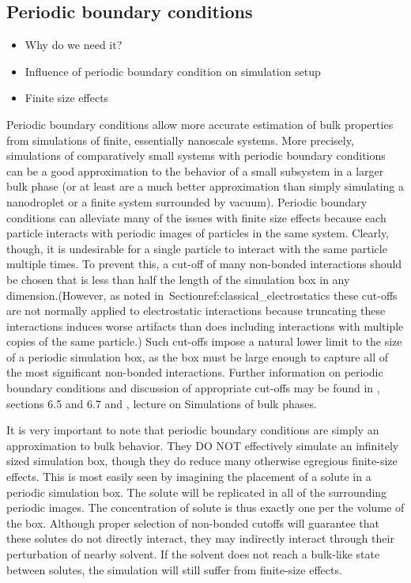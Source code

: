 \documentclass[9pt,bestpractices]{livecoms}
\begin{document}
\subsection{Periodic boundary conditions}
\label{sec:periodic}
\begin{itemize}
\item Why do we need it?
\item Influence of periodic boundary condition on simulation setup
\item Finite size effects
\end{itemize}


Periodic boundary conditions allow more accurate estimation of bulk properties from simulations of finite, essentially nanoscale systems.
More precisely, simulations of comparatively small systems with periodic boundary conditions can be a good approximation to the   behavior of a small subsystem in a larger bulk phase (or at least are a much better approximation than simply simulating a nanodroplet or a finite system surrounded by vacuum).
Periodic boundary conditions can alleviate many of the issues with finite size effects because each particle interacts with periodic images of particles in the same system.
Clearly, though, it is undesirable for a single particle to interact with the same particle multiple times.
To prevent this, a cut-off of many non-bonded interactions should be chosen that is less than half the length of the simulation box in any dimension.(However, as noted in~Section{ref:classical_electrostatics} these cut-offs are not normally applied to electrostatic interactions because truncating these interactions induces worse artifacts than does including interactions with multiple copies of the same particle.)
Such cut-offs impose a natural lower limit to the size of a periodic simulation box, as the box must be large enough to capture all of the most significant non-bonded interactions.
Further information on periodic boundary conditions and discussion of appropriate cut-offs may be found in \citet{LeachBook}, sections 6.5 and 6.7 and \citet{ShellNotes}, lecture on Simulations of bulk phases.

It is very important to note that periodic boundary conditions are simply an approximation to bulk behavior.
They DO NOT effectively simulate an infinitely sized simulation box, though they do reduce many otherwise egregious finite-size effects.
This is most easily seen by imagining the placement of a solute in a periodic simulation box.
The solute will be replicated in all of the surrounding periodic images.
The concentration of solute is thus exactly one per the volume of the box.
Although proper selection of non-bonded cutoffs will guarantee that these solutes do not directly interact, they may indirectly interact through their perturbation of nearby solvent.
If the solvent does not reach a bulk-like state between solutes, the simulation will still suffer from finite-size effects.
\end{document}
